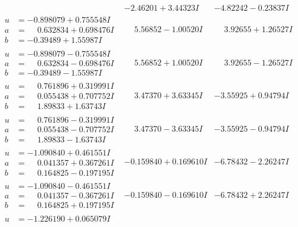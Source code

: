 \documentclass[1p]{elsarticle_modified}
\theoremstyle{definition}
\begin{document}
$$\begin{array}{c|c|c}
 & -2.46201 + 3.44323 I & -4.82242 - 0.23837 I \\ \hline\begin{aligned}
u &= -0.898079 + 0.755548 I \\
a &= \phantom{-}0.632834 + 0.698476 I \\
b &= -0.39489 + 1.55987 I\end{aligned}
 & \phantom{-}5.56852 - 1.00520 I & \phantom{-}3.92655 + 1.26527 I \\ \hline\begin{aligned}
u &= -0.898079 - 0.755548 I \\
a &= \phantom{-}0.632834 - 0.698476 I \\
b &= -0.39489 - 1.55987 I\end{aligned}
 & \phantom{-}5.56852 + 1.00520 I & \phantom{-}3.92655 - 1.26527 I \\ \hline\begin{aligned}
u &= \phantom{-}0.761896 + 0.319991 I \\
a &= \phantom{-}0.055438 + 0.707752 I \\
b &= \phantom{-}1.89833 + 1.63743 I\end{aligned}
 & \phantom{-}3.47370 + 3.63345 I & -3.55925 + 0.94794 I \\ \hline\begin{aligned}
u &= \phantom{-}0.761896 - 0.319991 I \\
a &= \phantom{-}0.055438 - 0.707752 I \\
b &= \phantom{-}1.89833 - 1.63743 I\end{aligned}
 & \phantom{-}3.47370 - 3.63345 I & -3.55925 - 0.94794 I \\ \hline\begin{aligned}
u &= -1.090840 + 0.461551 I \\
a &= \phantom{-}0.041357 + 0.367261 I \\
b &= \phantom{-}0.164825 - 0.197195 I\end{aligned}
 & -0.159840 + 0.169610 I & -6.78432 - 2.26247 I \\ \hline\begin{aligned}
u &= -1.090840 - 0.461551 I \\
a &= \phantom{-}0.041357 - 0.367261 I \\
b &= \phantom{-}0.164825 + 0.197195 I\end{aligned}
 & -0.159840 - 0.169610 I & -6.78432 + 2.26247 I \\ \hline\begin{aligned}
u &= -1.226190 + 0.065079 I \\

\end{aligned}
\end{array}$$
\end{document}
